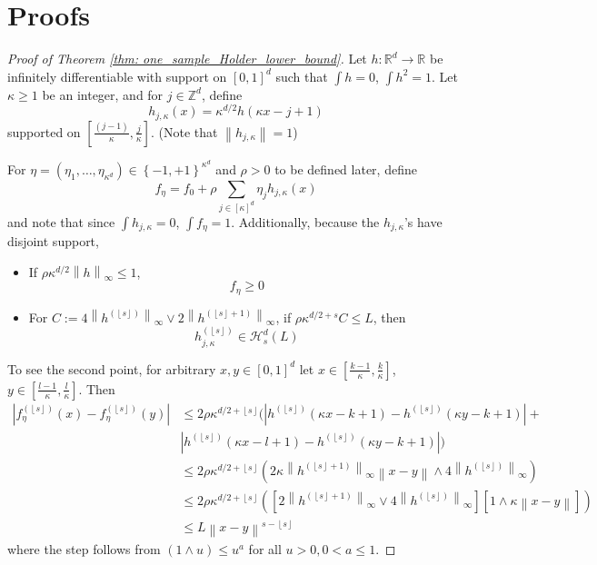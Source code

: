 \documentclass{article}
\newcommand{\Reals}{\mathbb{R}}
\newcommand{\norm}[1]{\left\lVert#1\right\rVert}
\newcommand{\abs}[1]{\left \lvert #1 \right \rvert}
\newcommand{\set}[1]{\left\{#1\right\}}
\newcommand{\floor}[1]{\left\lfloor #1 \right\rfloor}
\newcommand{\1}{\mathbb{I}}
\newcommand{\Rd}{\Reals^d}
\newcommand{\Hclass}{\mathcal{H}}
\theoremstyle{alden}
\theoremstyle{aldenthm}
\theoremstyle{definition}
\theoremstyle{remark}
\begin{document}
\section{Proofs}

\begin{proof}[Proof of Theorem \ref{thm: one_sample_Holder_lower_bound}]
	Let $h: \Rd \to \Reals$ be infinitely differentiable with support on $[0,1]^d$ such that $\int h = 0$, $\int h^2 = 1$. Let $\kappa \geq 1$ be an integer, and for $j \in \mathbb{Z}^d$, define
	\begin{equation*}
	h_{j,\kappa}(x) = \kappa^{d/2} h(\kappa x - j + 1)
	\end{equation*}
	supported on $[\frac{(j - 1)}{\kappa}, \frac{j}{\kappa}]$. (Note that $\norm{h_{j,\kappa}} = 1$)
	
	For $\eta = (\eta_1, \ldots, \eta_{\kappa^d}) \in \set{-1, +1}^{\kappa^d}$ and $\rho > 0$ to be defined later, define
	\begin{equation*}
	f_\eta = f_0 + \rho \sum_{j \in [\kappa]^d} \eta_j h_{j,\kappa}(x)
	\end{equation*}
	and note that since $\int h_{j,\kappa} = 0$, $\int f_{\eta} = 1$. Additionally, because the $h_{j,\kappa}$'s have disjoint support,
	\begin{itemize}
		\item 
		If $\rho \kappa^{d/2} \norm{h}_{\infty} \leq 1$,
		\begin{equation*}
		f_{\eta} \geq 0
		\end{equation*}
		
		\item
		For $C := 4 \norm{h^{(\floor{s})}}_{\infty} \vee 2 \norm{h^{(\floor{s } + 1)}}_{\infty}$, if $\rho \kappa^{d/2 + s} C \leq L$, then
		\begin{equation*}
		h_{j,\kappa}^{(\floor{s})} \in \Hclass_s^d(L)
		\end{equation*}
	\end{itemize}
	
	To see the second point, for arbitrary $x,y \in [0,1]^d$ let $x \in [\frac{k-1}{\kappa}, \frac{k}{\kappa}]$, $y \in [\frac{l-1}{\kappa}, \frac{l}{\kappa}]$. Then
	\begin{align*}
	\abs{f_{\eta}^{(\floor{s})}(x) - f_{\eta}^{(\floor{s})}(y)} & \leq 2 \rho \kappa^{d/2 + \floor{s}} \bigl(\abs{h^{(\floor{s})}(\kappa x - k  + 1) - h^{(\floor{s})}(\kappa y - k  + 1)} + \\
	& \abs{h^{(\floor{s})}(\kappa x - l  + 1) - h^{(\floor{s})}(\kappa y - k + 1)} \bigr) \\
	& \leq 2 \rho \kappa^{d/2 + \floor{s}} \left( 2 \kappa \norm{h^{(\floor{s} + 1)} }_{\infty} \norm{x - y} \wedge 4 \norm{h^{(\floor{s})}}_{\infty} \right) \\
	& \leq  2 \rho \kappa^{d/2 + \floor{s}} \left( \left[2 \norm{h^{(\floor{s} + 1)}}_{\infty} \vee 4 \norm{h^{(\floor{s})}}_{\infty} \right] \left[1 \wedge \kappa \norm{x - y}\right]  \right) \\
	& \leq L \norm{x - y}^{s - \floor{s}}
	\end{align*}
	where the step follows from $(1 \wedge u) \leq u^a$ for all $u > 0, 0 < a \leq 1$.
	

\end{proof}
\end{document}

